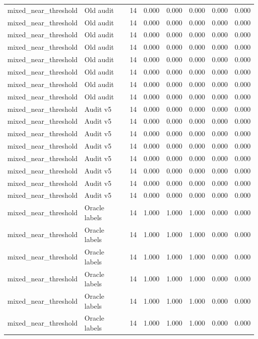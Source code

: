 {\begin{longtable}{llrrrrrr}
mixed\_near\_threshold & Old audit & 14 & 0.000 & 0.000 & 0.000 & 0.000 & 0.000 \\
mixed\_near\_threshold & Old audit & 14 & 0.000 & 0.000 & 0.000 & 0.000 & 0.000 \\
mixed\_near\_threshold & Old audit & 14 & 0.000 & 0.000 & 0.000 & 0.000 & 0.000 \\
mixed\_near\_threshold & Old audit & 14 & 0.000 & 0.000 & 0.000 & 0.000 & 0.000 \\
mixed\_near\_threshold & Old audit & 14 & 0.000 & 0.000 & 0.000 & 0.000 & 0.000 \\
mixed\_near\_threshold & Old audit & 14 & 0.000 & 0.000 & 0.000 & 0.000 & 0.000 \\
mixed\_near\_threshold & Old audit & 14 & 0.000 & 0.000 & 0.000 & 0.000 & 0.000 \\
mixed\_near\_threshold & Old audit & 14 & 0.000 & 0.000 & 0.000 & 0.000 & 0.000 \\
mixed\_near\_threshold & Audit v5 & 14 & 0.000 & 0.000 & 0.000 & 0.000 & 0.000 \\
mixed\_near\_threshold & Audit v5 & 14 & 0.000 & 0.000 & 0.000 & 0.000 & 0.000 \\
mixed\_near\_threshold & Audit v5 & 14 & 0.000 & 0.000 & 0.000 & 0.000 & 0.000 \\
mixed\_near\_threshold & Audit v5 & 14 & 0.000 & 0.000 & 0.000 & 0.000 & 0.000 \\
mixed\_near\_threshold & Audit v5 & 14 & 0.000 & 0.000 & 0.000 & 0.000 & 0.000 \\
mixed\_near\_threshold & Audit v5 & 14 & 0.000 & 0.000 & 0.000 & 0.000 & 0.000 \\
mixed\_near\_threshold & Audit v5 & 14 & 0.000 & 0.000 & 0.000 & 0.000 & 0.000 \\
mixed\_near\_threshold & Audit v5 & 14 & 0.000 & 0.000 & 0.000 & 0.000 & 0.000 \\
mixed\_near\_threshold & Oracle labels & 14 & 1.000 & 1.000 & 1.000 & 0.000 & 0.000 \\
mixed\_near\_threshold & Oracle labels & 14 & 1.000 & 1.000 & 1.000 & 0.000 & 0.000 \\
mixed\_near\_threshold & Oracle labels & 14 & 1.000 & 1.000 & 1.000 & 0.000 & 0.000 \\
mixed\_near\_threshold & Oracle labels & 14 & 1.000 & 1.000 & 1.000 & 0.000 & 0.000 \\
mixed\_near\_threshold & Oracle labels & 14 & 1.000 & 1.000 & 1.000 & 0.000 & 0.000 \\
mixed\_near\_threshold & Oracle labels & 14 & 1.000 & 1.000 & 1.000 & 0.000 & 0.000 \\

\end{longtable}}
